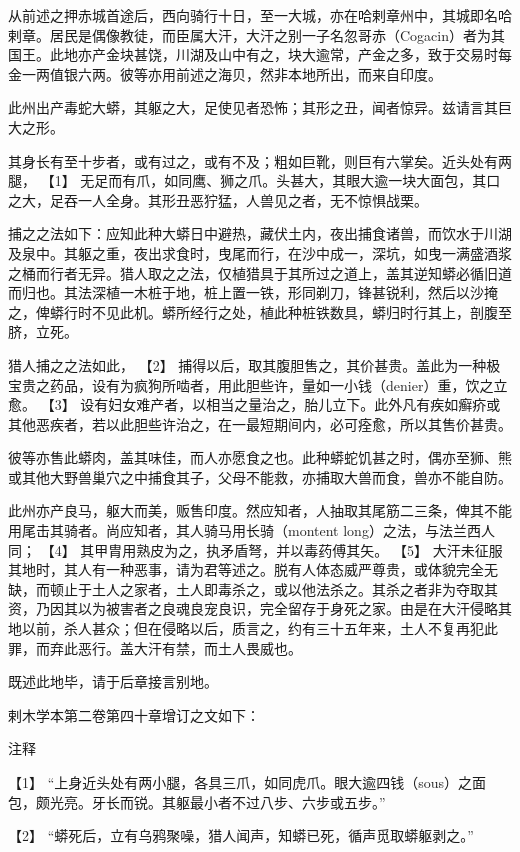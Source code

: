 \documentclass[12pt,UTF8]{ctexbook}
\begin{document}
从前述之押赤城首途后，西向骑行十日，至一大城，亦在哈剌章州中，其城即名哈剌章。居民是偶像教徒，而臣属大汗，大汗之别一子名忽哥赤（Cogacin）者为其国王。此地亦产金块甚饶，川湖及山中有之，块大逾常，产金之多，致于交易时每金一两值银六两。彼等亦用前述之海贝，然非本地所出，而来自印度。

此州出产毒蛇大蟒，其躯之大，足使见者恐怖；其形之丑，闻者惊异。兹请言其巨大之形。

其身长有至十步者，或有过之，或有不及；粗如巨靴，则巨有六掌矣。近头处有两腿， 【1】 无足而有爪，如同鹰、狮之爪。头甚大，其眼大逾一块大面包，其口之大，足吞一人全身。其形丑恶狞猛，人兽见之者，无不惊惧战栗。

捕之之法如下：应知此种大蟒日中避热，藏伏土内，夜出捕食诸兽，而饮水于川湖及泉中。其躯之重，夜出求食时，曳尾而行，在沙中成一，深坑，如曳一满盛酒浆之桶而行者无异。猎人取之之法，仅植猎具于其所过之道上，盖其逆知蟒必循旧道而归也。其法深植一木桩于地，桩上置一铁，形同剃刀，锋甚锐利，然后以沙掩之，俾蟒行时不见此机。蟒所经行之处，植此种桩铁数具，蟒归时行其上，剖腹至脐，立死。

猎人捕之之法如此， 【2】 捕得以后，取其腹胆售之，其价甚贵。盖此为一种极宝贵之药品，设有为疯狗所啮者，用此胆些许，量如一小钱（denier）重，饮之立愈。 【3】 设有妇女难产者，以相当之量治之，胎儿立下。此外凡有疾如癣疥或其他恶疾者，若以此胆些许治之，在一最短期间内，必可痊愈，所以其售价甚贵。

彼等亦售此蟒肉，盖其味佳，而人亦愿食之也。此种蟒蛇饥甚之时，偶亦至狮、熊或其他大野兽巢穴之中捕食其子，父母不能救，亦捕取大兽而食，兽亦不能自防。

此州亦产良马，躯大而美，贩售印度。然应知者，人抽取其尾筋二三条，俾其不能用尾击其骑者。尚应知者，其人骑马用长骑（montent long）之法，与法兰西人同； 【4】 其甲胄用熟皮为之，执矛盾弩，并以毒药傅其矢。 【5】 大汗未征服其地时，其人有一种恶事，请为君等述之。脱有人体态威严尊贵，或体貌完全无缺，而顿止于土人之家者，土人即毒杀之，或以他法杀之。其杀之者非为夺取其资，乃因其以为被害者之良魂良宠良识，完全留存于身死之家。由是在大汗侵略其地以前，杀人甚众；但在侵略以后，质言之，约有三十五年来，土人不复再犯此罪，而弃此恶行。盖大汗有禁，而土人畏威也。

既述此地毕，请于后章接言别地。

剌木学本第二卷第四十章增订之文如下：

注释

【1】 “上身近头处有两小腿，各具三爪，如同虎爪。眼大逾四钱（sous）之面包，颇光亮。牙长而锐。其躯最小者不过八步、六步或五步。”

【2】 “蟒死后，立有乌鸦聚噪，猎人闻声，知蟒已死，循声觅取蟒躯剥之。”
\end{document}
